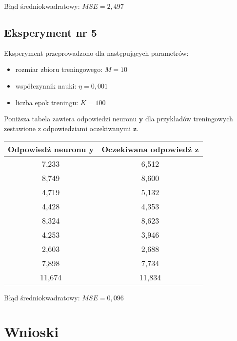 \documentclass[12pt]{article}
\begin{document}
Błąd średniokwadratowy: $MSE = 2,497$

\subsection{Eksperyment nr 5}

Eksperyment przeprowadzono dla następujących parametrów:

\begin{itemize}
\item rozmiar zbioru treningowego: $M = 10$ 
\item współczynnik nauki: $\eta = 0,001$
\item liczba epok treningu: $K = 100$
\end{itemize}

Poniższa tabela zawiera odpowiedzi neuronu $\textbf{y}$ dla przykładów treningowych zestawione z odpowiedziami oczekiwanymi $\textbf{z}$.

\clearpage

\begin{table}
\begin{tabular}{|c|c|}
\hline 
Odpowiedź neuronu $\textbf{y}$ & Oczekiwana odpowiedź $\textbf{z}$ \\ 
\hline 
7,233 & 6,512 \\ \hline
8,749 & 8,600 \\ \hline
4,719 & 5,132 \\ \hline
4,428 & 4,353 \\ \hline
8,324 & 8,623 \\ \hline
4,253 & 3,946 \\ \hline
2,603 & 2,688 \\ \hline
7,898 & 7,734 \\ \hline
11,674 & 11,834 \\ \hline
\end{tabular} 
\end{table}

Błąd średniokwadratowy: $MSE = 0,096$

\section{Wnioski}
\end{document}
